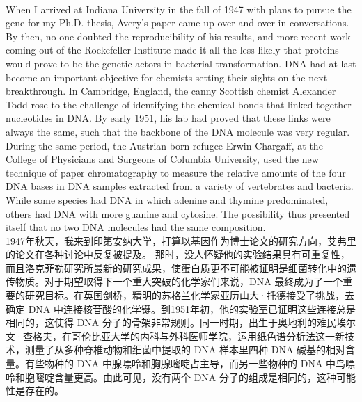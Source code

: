 \documentclass{article}
\begin{document}
\\
When I arrived at Indiana University in the fall of 1947 with plans to pursue the gene for my Ph.D. thesis, Avery’s paper came up over and over in conversations.
By then, no one doubted the reproducibility of his results, and more recent work coming out of the Rockefeller Institute made it all the less likely that proteins would prove to be the genetic actors in bacterial transformation. DNA had at last become an important objective for chemists setting their sights on the next breakthrough. In Cambridge, England, the canny Scottish chemist Alexander Todd rose to the challenge of identifying the chemical bonds that linked together nucleotides in DNA. By early 1951, his lab had proved that these links were always the same, such that the backbone of the DNA molecule was very regular. During the same period, the Austrian-born refugee Erwin Chargaff, at the College of Physicians and Surgeons of Columbia University, used the new technique of paper chromatography to measure the relative amounts of the four DNA bases in DNA samples extracted from a variety of vertebrates and bacteria. While some species had DNA in which adenine and thymine predominated, others had DNA with more guanine and cytosine. The possibility thus presented itself that no two DNA molecules had the same composition.\\
1947年秋天，我来到印第安纳大学，打算以基因作为博士论文的研究方向，艾弗里的论文在各种讨论中反复被提及。
那时，没人怀疑他的实验结果具有可重复性，而且洛克菲勒研究所最新的研究成果，使蛋白质更不可能被证明是细菌转化中的遗传物质。对于期望取得下一个重大突破的化学家们来说，DNA 最终成为了一个重要的研究目标。在英国剑桥，精明的苏格兰化学家亚历山大·托德接受了挑战，去确定 DNA 中连接核苷酸的化学键。到1951年初，他的实验室已证明这些连接总是相同的，这使得 DNA 分子的骨架非常规则。同一时期，出生于奥地利的难民埃尔文·查格夫，在哥伦比亚大学的内科与外科医师学院，运用纸色谱分析法这一新技术，测量了从多种脊椎动物和细菌中提取的 DNA 样本里四种 DNA 碱基的相对含量。有些物种的 DNA 中腺嘌呤和胸腺嘧啶占主导，而另一些物种的 DNA 中鸟嘌呤和胞嘧啶含量更高。由此可见，没有两个 DNA 分子的组成是相同的，这种可能性是存在的。 \\
\end{document}

